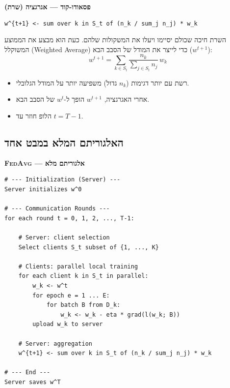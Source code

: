 \documentclass[11pt,a4paper]{article}
\newenvironment{infobox}[2][gray]{%
  \par\smallskip
  \begin{mdframed}[
    linecolor=#1!60!black,
    linewidth=0.7pt,
    backgroundcolor=#1!6,
    roundcorner=3pt,
    innertopmargin=7pt,
    innerbottommargin=7pt,
    innerleftmargin=8pt,
    innerrightmargin=8pt,
    skipabove=6pt,
    skipbelow=6pt
  ]%
  {\color{#1!70!black}\bfseries #2}\par\smallskip
}{%
  \end{mdframed}%
  \par\smallskip
}
\newenvironment{codebox}[1]{\begin{infobox}[gray]{#1}\begin{english}\setLTR}{\end{english}\end{infobox}}
\newcommand{\FedAvg}{\textsc{FedAvg}}
\begin{document}
\begin{codebox}{פסאודו-קוד --- אגרגציה (שרת)}
\begin{lstlisting}[language={}]
w^{t+1} <- sum over k in S_t of (n_k / sum_j n_j) * w_k
\end{lstlisting}
\end{codebox}

השרת חיכה שכולם יסיימו ויעלו את המשקולות שלהם.
כעת הוא מבצע את הממוצע המשוקלל (Weighted Average) כדי לייצר את המודל של הסבב הבא ($w^{t+1}$):
\begin{equation}
  w^{t+1} = \sum_{k \in S_t} \frac{n_k}{\sum_{j \in S_t} n_j} \, w_k
  \label{eq:fedavg-aggregation-step}
\end{equation}

\begin{itemize}
  \item רשת עם יותר דגימות ($n_k$ גדול) משפיעה יותר על המודל הגלובלי.
  \item אחרי האגרגציה, $w^{t+1}$ הופך ל-$w^t$ של הסבב הבא.
  \item הלופ חוזר עד $t = T-1$.
\end{itemize}

\subsection{האלגוריתם המלא במבט אחד}

\begin{codebox}{\FedAvg{} --- אלגוריתם מלא}
\begin{lstlisting}[language={}]
# --- Initialization (Server) ---
Server initializes w^0

# --- Communication Rounds ---
for each round t = 0, 1, 2, ..., T-1:

    # Server: client selection
    Select clients S_t subset of {1, ..., K}

    # Clients: parallel local training
    for each client k in S_t in parallel:
        w_k <- w^t
        for epoch e = 1 ... E:
            for batch B from D_k:
                w_k <- w_k - eta * grad(l(w_k; B))
        upload w_k to server

    # Server: aggregation
    w^{t+1} <- sum over k in S_t of (n_k / sum_j n_j) * w_k

# --- End ---
Server saves w^T
\end{lstlisting}
\end{codebox}
\end{document}
